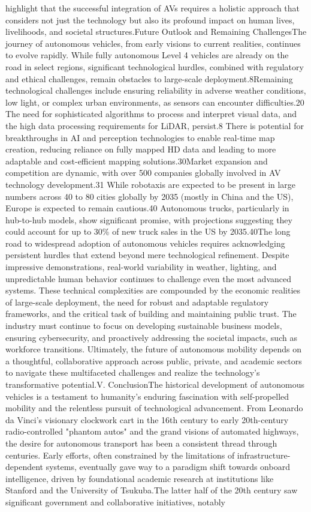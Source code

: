 highlight that the successful integration of AVs requires a holistic approach that considers not just the technology but also its profound impact on human lives, livelihoods, and societal structures.Future Outlook and Remaining ChallengesThe journey of autonomous vehicles, from early visions to current realities, continues to evolve rapidly. While fully autonomous Level 4 vehicles are already on the road in select regions, significant technological hurdles, combined with regulatory and ethical challenges, remain obstacles to large-scale deployment.8Remaining technological challenges include ensuring reliability in adverse weather conditions, low light, or complex urban environments, as sensors can encounter difficulties.20 The need for sophisticated algorithms to process and interpret visual data, and the high data processing requirements for LiDAR, persist.8 There is potential for breakthroughs in AI and perception technologies to enable real-time map creation, reducing reliance on fully mapped HD data and leading to more adaptable and cost-efficient mapping solutions.30Market expansion and competition are dynamic, with over 500 companies globally involved in AV technology development.31 While robotaxis are expected to be present in large numbers across 40 to 80 cities globally by 2035 (mostly in China and the US), Europe is expected to remain cautious.40 Autonomous trucks, particularly in hub-to-hub models, show significant promise, with projections suggesting they could account for up to 30\% of new truck sales in the US by 2035.40The long road to widespread adoption of autonomous vehicles requires acknowledging persistent hurdles that extend beyond mere technological refinement. Despite impressive demonstrations, real-world variability in weather, lighting, and unpredictable human behavior continues to challenge even the most advanced systems. These technical complexities are compounded by the economic realities of large-scale deployment, the need for robust and adaptable regulatory frameworks, and the critical task of building and maintaining public trust. The industry must continue to focus on developing sustainable business models, ensuring cybersecurity, and proactively addressing the societal impacts, such as workforce transitions. Ultimately, the future of autonomous mobility depends on a thoughtful, collaborative approach across public, private, and academic sectors to navigate these multifaceted challenges and realize the technology's transformative potential.V. ConclusionThe historical development of autonomous vehicles is a testament to humanity's enduring fascination with self-propelled mobility and the relentless pursuit of technological advancement. From Leonardo da Vinci's visionary clockwork cart in the 16th century to early 20th-century radio-controlled "phantom autos" and the grand visions of automated highways, the desire for autonomous transport has been a consistent thread through centuries. Early efforts, often constrained by the limitations of infrastructure-dependent systems, eventually gave way to a paradigm shift towards onboard intelligence, driven by foundational academic research at institutions like Stanford and the University of Tsukuba.The latter half of the 20th century saw significant government and collaborative initiatives, notably 